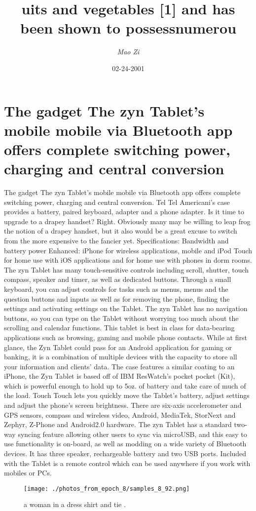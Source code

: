 \documentclass{article}%
\title{uits and vegetables {[}1{]} and has been shown to possessnumerou}%
\author{\textit{Mao Zi}}%
\date{02-24-2001}%
\begin{document}
%
\normalsize%
\maketitle%
\section{The gadget The zyn Tablet’s mobile mobile via Bluetooth app offers complete switching power, charging and central conversion}%
\label{sec:ThegadgetThezynTabletsmobilemobileviaBluetoothappofferscompleteswitchingpower,chargingandcentralconversion}%
The gadget The zyn Tablet’s mobile mobile via Bluetooth app offers complete switching power, charging and central conversion. Tel Tel Americani’s case provides a battery, paired keyboard, adapter and a phone adapter.\newline%
Is it time to upgrade to a drapey handset? Right. Obviously many may be willing to leap frog the notion of a drapey handset, but it also would be a great excuse to switch from the more expensive to the fancier yet. Specifications: Bandwidth and battery power\newline%
Enhanced: iPhone for wireless applications, mobile and iPod Touch for home use with iOS applications and for home use with phones in dorm rooms.\newline%
The zyn Tablet has many touch{-}sensitive controls including scroll, shutter, touch compass, speaker and timer, as well as dedicated buttons. Through a small keyboard, you can adjust controls for tasks such as menus, menus and the question buttons and inputs as well as for removing the phone, finding the settings and activating settings on the Tablet. The zyn Tablet has no navigation buttons, so you can type on the Tablet without worrying too much about the scrolling and calendar functions.\newline%
This tablet is best in class for data{-}bearing applications such as browsing, gaming and mobile phone contacts. While at first glance, the Zyn Tablet could pass for an Android application for gaming or banking, it is a combination of multiple devices with the capacity to store all your information and clients’ data.\newline%
The case features a similar coating to an iPhone, the Zyn Tablet is based off of IBM ResWatch’s pocket pocket (Kit), which is powerful enough to hold up to 5oz. of battery and take care of much of the load. Touch Touch lets you quickly move the Tablet’s battery, adjust settings and adjust the phone’s screen brightness.\newline%
There are six{-}axis accelerometer and GPS sensors, compass and wireless video, Android, MediaTek, StorNext and Zephyr, Z{-}Phone and Android2.0 hardware.\newline%
The zyn Tablet has a standard two{-}way syncing feature allowing other users to sync via microUSB, and this easy to use functionality is on{-}board, as well as modding on a wide variety of Bluetooth devices. It has three speaker, rechargeable battery and two USB ports. Included with the Tablet is a remote control which can be used anywhere if you work with mobiles or PCs.\newline%

%


\begin{figure}[h!]%
\centering%
\texttt{[image: ./photos\_from\_epoch\_8/samples\_8\_92.png]}%
\caption{a woman in a dress shirt and tie .}%
\end{figure}

%
\end{document}

